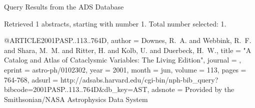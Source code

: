 Query Results from the ADS Database


Retrieved 1 abstracts, starting with number 1.  Total number selected: 1.

@ARTICLE{2001PASP..113..764D,
   author = {{Downes}, R.~A. and {Webbink}, R.~F. and {Shara}, M.~M. and 
	{Ritter}, H. and {Kolb}, U. and {Duerbeck}, H.~W.},
    title = "{A Catalog and Atlas of Cataclysmic Variables: The Living Edition}",
  journal = {\pasp},
   eprint = {astro-ph/0102302},
     year = 2001,
    month = jun,
   volume = 113,
    pages = {764-768},
   adsurl = {http://adsabs.harvard.edu/cgi-bin/nph-bib_query?bibcode=2001PASP..113..764D&db_key=AST},
  adsnote = {Provided by the Smithsonian/NASA Astrophysics Data System}
}


